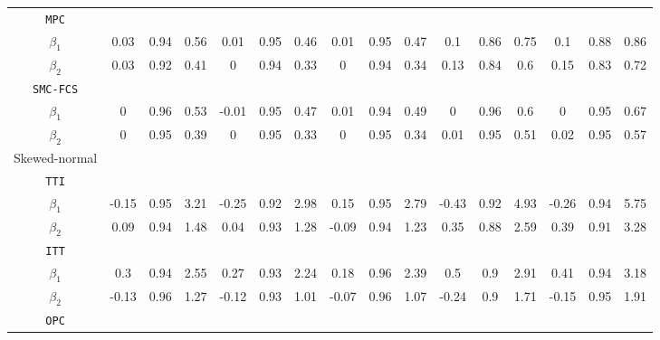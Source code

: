 \begin{table}[ht!]
{\begin{tabular}{c|ccc|ccc|ccc|ccc|ccc}
				\texttt{MPC}            &        &        &        &        &        &        &        &        &        &        &        &        &        &        &        \\
				$\beta_1$      & 0.03  & 0.94  & 0.56  & 0.01  & 0.95  & 0.46  & 0.01      & 0.95  & 0.47  & 0.1  & 0.86  & 0.75  & 0.1  & 0.88  & 0.86  \\
				$\beta_2$      & 0.03  & 0.92  & 0.41  & 0  & 0.94  & 0.33  & 0  & 0.94  & 0.34  & 0.13   & 0.84  & 0.6  & 0.15  & 0.83  & 0.72  \\
				\texttt{SMC-FCS}        &        &        &        &        &        &        &        &        &        &        &        &        &        &        &        \\
				$\beta_1$      & 0  & 0.96  & 0.53  & -0.01  & 0.95  & 0.47  & 0.01  & 0.94  & 0.49  & 0  & 0.96  & 0.6  & 0  & 0.95  & 0.67  \\
				$\beta_2$      & 0  & 0.95  & 0.39  & 0  & 0.95  & 0.33  & 0  & 0.95  & 0.34  & 0.01  & 0.95  & 0.51  & 0.02  & 0.95  & 0.57  \\
				\hline
				Skewed-normal    &        &        &        &        &        &        &        &        &        &        &        &        &        &        &        \\
				\texttt{TTI}            &        &        &        &        &        &        &        &        &        &        &        &        &        &        &        \\
				$\beta_1$      & -0.15  & 0.95  & 3.21  & -0.25  & 0.92  & 2.98  & 0.15  & 0.95   & 2.79  & -0.43  & 0.92  & 4.93  & -0.26  & 0.94  & 5.75  \\
				$\beta_2$      & 0.09  & 0.94  & 1.48  & 0.04  & 0.93  & 1.28  & -0.09  & 0.94  & 1.23  & 0.35  & 0.88  & 2.59  & 0.39  & 0.91  & 3.28  \\
				\texttt{ITT}            &        &        &        &        &        &        &        &        &        &        &        &        &        &        &        \\
				$\beta_1$      & 0.3  & 0.94  & 2.55  & 0.27  & 0.93  & 2.24  & 0.18  & 0.96   & 2.39  & 0.5  & 0.9  & 2.91  & 0.41  & 0.94  & 3.18  \\
				$\beta_2$      & -0.13  & 0.96  & 1.27  & -0.12  & 0.93  & 1.01  & -0.07  & 0.96  & 1.07  & -0.24  & 0.9  & 1.71  & -0.15  & 0.95  & 1.91  \\
				\texttt{OPC}            &        &        &        &        &        &        &        &        &        &        &        &        &        &        &        \\

\end{tabular}}
\end{table}
